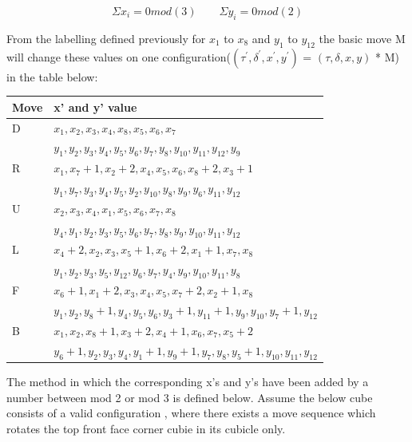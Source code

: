 \documentclass{article}
\begin{document}
\begin{equation}
\Sigma x_{i} =0mod(3) \qquad \Sigma y_{i} =0mod(2) 
\end{equation}

From the labelling defined previously for $x_{1}$ to $x_{8}$ and $y_{1}$ to $y_{12}$ the basic move M will change these values on one configuration($(\tau^{'} ,\delta^{'} , x^{'} , y^{'} )$ = $(\tau,\delta, x, y)$ * M) in the table below\cite{chengroup}:

\begin{center}
\label{:paritytable}
    \begin{tabular}{ | l | p{12cm} |}
    \hline
    Move & x' and y' value \\ \hline
    D &  $x_1,x_2,x_3,x_4,x_8,x_5,x_6,x_7$ \\
& $y_1,y_2,y_3,y_4,y_5,y_6,y_7,y_8,y_{10},y_{11},y_{12},y_9$\\ \hline
    R &  $x_1,x_7 +1,x_2 +2,x_4,x_5,x_6,x_8 +2,x_3 +1$\\ & $y_1,y_7,y_3,y_4,y_5,y_2,y_{10},y_{8},y_{9},y_{6},y_{11},y_{12}$\\ \hline
    U &  $x_2,x_3,x_4,x_1,x_5,x_6,x_7,x_8$ \\ & $y_4,y_1,y_2,y_3,y_5,y_6,y_{7},y_{8},y_{9},y_{10},y_{11},y_{12}$\\ \hline
    L & $x_4 +2,x_2,x_3,x_5 + 1,x_6 +2,x_1 + 1,x_7,x_8$ \\
& $y_1,y_2,y_3,y_5,y_12,y_6,y_{7},y_{4},y_{9},y_{10},y_{11},y_{8}$\\ \hline
    F &  $x_6 +1,x_1 +2,x_3,x_4,x_5,x_7 +2,x_2 +1,x_8$\\
& $y_1,y_2,y_8 +1,y_4,y_5,y_6,y_{3}+1,y_{11}+1,y_{9},y_{10},y_{7}+1,y_{12}$\\ \hline
    B &  $x_1,x_2,x_8 +1,x_3 + 2,x_4 + 1,x_6,x_7,x_5 +2$ \\
&$y_6 +1,y_2,y_3,y_4,y_1 +1,y_9 +1,y_{7},y_{8},y_{5}+1,y_{10},y_{11},y_{12}$\\ \hline
    \end{tabular}
\end{center}
The method in which the corresponding x's and y's have been added by a number between mod 2 or mod 3 is defined below. Assume the below cube consists of a valid configuration , where there exists a move sequence which rotates the top front face corner cubie in its cubicle only. 
\end{document}
